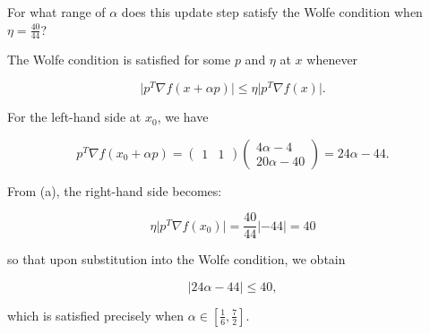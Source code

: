 For what range of $\alpha$ does this update step satisfy the Wolfe condition when $\eta = \frac{40}{44}$?

\begin{solution}
    The Wolfe condition is satisfied for some $p$ and $\eta$ at $x$ whenever

    $$
    \lvert p^T \nabla f(x + \alpha p) \rvert \le \eta \lvert p^T \nabla f(x) \rvert.
    $$

    For the left-hand side at $x_0$, we have

    $$
    p^T \nabla f(x_0 + \alpha p) = \begin{pmatrix*}
        1 & 1
    \end{pmatrix*} \begin{pmatrix*}
        4 \alpha - 4 \\
        20 \alpha - 40
    \end{pmatrix*} = 24 \alpha - 44.
    $$

    From (a), the right-hand side becomes:

    $$
    \eta \lvert p^T \nabla f(x_0) \rvert = \frac{40}{44} \lvert -44 \rvert = 40
    $$

    so that upon substitution into the Wolfe condition, we obtain

    $$
    \lvert 24 \alpha - 44 \rvert \le 40,
    $$

    which is satisfied precisely when $\alpha \in \left[ \frac{1}{6}, \frac{7}{2} \right]$.

    \ \\
    \vfill
\end{solution}